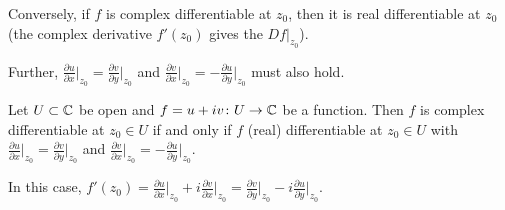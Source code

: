 \documentclass[10pt,aspectratio=169]{beamer}
\begin{document}
\begin{frame}

Conversely,
if $f$ is complex differentiable at $z_0$, then it is real
differentiable at $z_0$ (the complex derivative $f'(z_0)$ gives the
$Df|_{z_0}$).

\medskip
\pause

Further,
$\frac{\partial u}{\partial x}\big|_{z_0} = \frac{\partial v}{\partial
y}\big|_{z_0}$ and $\frac{\partial v}{\partial x}\big|_{z_0} = -\frac{\partial
u}{\partial y}\big|_{z_0}$
must also hold.

\pause

\begin{proposition}
Let $U \subset {\mathbb{C}}$ be open and $f = u+iv \colon U \to {\mathbb{C}}$ be a function.
Then
$f$ is complex differentiable at $z_0 \in U$
if and only if
$f$ (real) differentiable at $z_0 \in U$
with
$\frac{\partial u}{\partial x}\big|_{z_0} =
\frac{\partial v}{\partial y}\big|_{z_0}$
and
$\frac{\partial v}{\partial x}\big|_{z_0} =
-\frac{\partial u}{\partial y}\big|_{z_0}$.

\pause
In this case,
$f'(z_0) = 
\frac{\partial u}{\partial x}\big|_{z_0} + i \frac{\partial v}{\partial
x}\big|_{z_0} = \frac{\partial v}{\partial y}\big|_{z_0} - i \frac{\partial
u}{\partial y}\big|_{z_0}$.
\end{proposition}

\end{frame}
\end{document}
